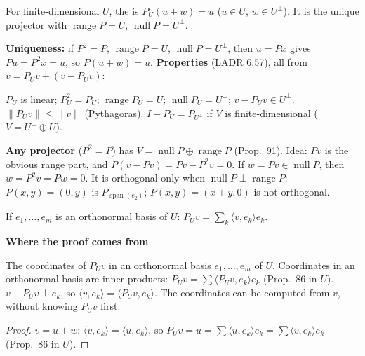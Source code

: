 \documentclass[10pt]{scrartcl}
\DeclareMathOperator{\nul}{null}
\DeclareMathOperator{\range}{range}
\DeclareMathOperator{\spn}{span}
\newcommand{\ip}[2]{\langle #1,#2\rangle}
\newenvironment{motive}{\begin{mdframed}[style=thinkbox]\textbf{\color{OliveGreen!75!black}Where the proof comes from}\begin{description}[leftmargin=0.9em,labelindent=0pt,itemsep=2pt,topsep=2pt,font=\normalfont\bfseries\color{OliveGreen!70!black}]}{\end{description}\end{mdframed}}
\begin{document}
\begin{definition*}
  For finite-dimensional $U$, the  is $P_U(u+w)=u$ ($u\in U$, $w\in U^\perp$). It is the unique projector with $\range P=U$, $\nul P=U^\perp$.
\end{definition*}
\begin{itemize}
  \ii \textbf{Uniqueness:} if $P^2=P$, $\range P=U$, $\nul P=U^\perp$, then $u=Px$ gives $Pu=P^2x=u$, so $P(u+w)=u$.
  \ii \textbf{Properties} (LADR 6.57), all from $v=P_Uv+(v-P_Uv)$:
  \begin{itemize}
    \ii $P_U$ is linear; $P_U^2=P_U$; $\range P_U=U$; $\nul P_U=U^\perp$; $v-P_Uv\in U^\perp$.
    \ii $\|P_Uv\|\le\|v\|$ (Pythagoras).
    \ii $I-P_U=P_{U^\perp}$ if $V$ is finite-dimensional ($V=U^\perp\oplus U$).
  \end{itemize}
  \ii \textbf{Any projector} ($P^2=P$) has $V=\nul P\oplus\range P$ (Prop.~91). Idea: $Pv$ is the obvious range part, and $P(v-Pv)=Pv-P^2v=0$. If $w=Pv\in\nul P$, then $w=P^2v=Pw=0$.
  \ii It is orthogonal only when $\nul P\perp\range P$: $P(x,y)=(0,y)$ is $P_{\spn(e_2)}$; $P(x,y)=(x+y,0)$ is not orthogonal.
\end{itemize}

\begin{proposition*}
  If $e_1,\dots,e_m$ is an orthonormal basis of $U$: $P_Uv=\sum_k\ip v{e_k}e_k$.
\end{proposition*}
\begin{motive}
  \ii[Want.] The coordinates of $P_Uv$ in an orthonormal basis $e_1,\dots,e_m$ of $U$.
  \ii[Know.] Coordinates in an orthonormal basis are inner products: $P_Uv=\sum\ip{P_Uv}{e_k}e_k$ (Prop.~86 in $U$).
   $v-P_Uv\perp e_k$, so $\ip v{e_k}=\ip{P_Uv}{e_k}$. The coordinates can be computed from $v$, without knowing $P_Uv$ first.
\end{motive}
\begin{proof}
  $v=u+w$: $\ip v{e_k}=\ip u{e_k}$, so $P_Uv=u=\sum\ip u{e_k}e_k=\sum\ip v{e_k}e_k$ (Prop.~86 in $U$).
\end{proof}
\end{document}
